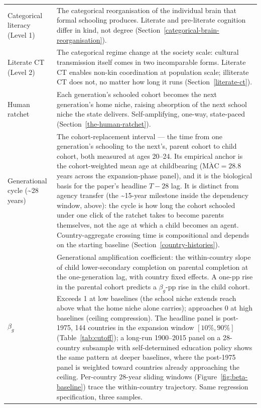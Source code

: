 \documentclass[12pt,letterpaper]{article}
\begin{document}
\begin{longtable}{@{}p{}p{}@{}}
Categorical literacy (Level 1) &
The categorical reorganisation of the individual brain that formal
schooling produces. Literate and pre-literate cognition differ in
kind, not degree
(Section~\ref{categorical-brain-reorganisation}). \\

Literate CT (Level 2) &
The categorical regime change at the society scale: cultural
transmission itself comes in two incomparable forms. Literate CT
enables non-kin coordination at population scale; illiterate CT
does not, no matter how long it runs
(Section~\ref{literate-ct}). \\

Human ratchet &
Each generation's schooled cohort becomes the next generation's home
niche, raising absorption of the next school niche the state
delivers. Self-amplifying, one-way, state-paced
(Section~\ref{the-human-ratchet}). \\

Generational cycle (\textasciitilde 28 years) &
The cohort-replacement interval --- the time from one generation's
schooling to the next's, parent cohort to child cohort, both measured
at ages 20--24. Its empirical anchor is the cohort-weighted mean age
at childbearing ($\overline{\mathrm{MAC}} = 28.8$ years across the
expansion-phase panel), and it is the biological basis for the paper's
headline $T{-}28$ lag. It is distinct from agency transfer (the
\textasciitilde 15-year milestone inside the dependency window,
above): the cycle is how long the cohort schooled under one click of
the ratchet takes to become parents themselves, not the age at which a
child becomes an agent. Country-aggregate crossing time is
compositional and depends on the starting baseline
(Section~\ref{country-histories}). \\

$\beta_g$ &
Generational amplification coefficient: the within-country slope of
child lower-secondary completion on parental completion at the
one-generation lag, with country fixed effects. A one-pp rise in
the parental cohort predicts a $\beta_g$-pp rise in the child cohort.
Exceeds 1 at low baselines (the school niche extends reach above
what the home niche alone carries); approaches 0 at high baselines
(ceiling compression). The headline panel is post-1975, 144 countries
in the expansion window $[10\%, 90\%]$
(Table~\ref{tab:cutoff}); a long-run 1900--2015 panel on a
28-country subsample with self-determined education policy
shows the same pattern at
deeper baselines, where the post-1975 panel is weighted toward
countries already approaching the ceiling. Per-country 28-year sliding windows
(Figure~\ref{fig:beta-baseline}) trace the within-country trajectory. Same
regression specification, three samples. \\


\end{longtable}
\end{document}
